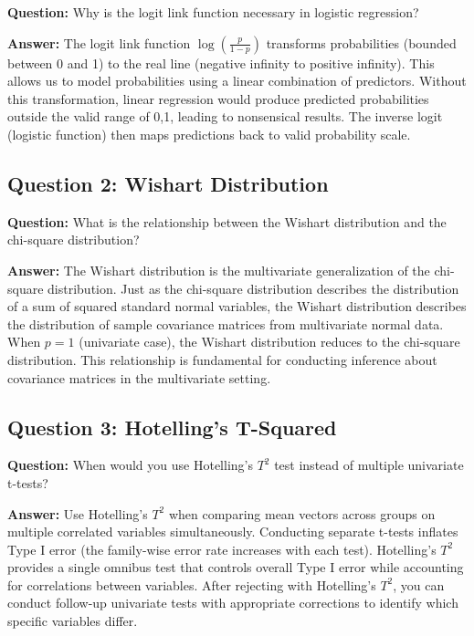 \documentclass[
]{article}
\begin{document}
\textbf{Question:} Why is the logit link function necessary in logistic
regression?

\textbf{Answer:} The logit link function \(\log(\frac{p}{1 - p})\)
transforms probabilities (bounded between 0 and 1) to the real line
(negative infinity to positive infinity). This allows us to model
probabilities using a linear combination of predictors. Without this
transformation, linear regression would produce predicted probabilities
outside the valid range of 0,1, leading to nonsensical results. The
inverse logit (logistic function) then maps predictions back to valid
probability scale.

\textbf{ }

\subsection{Question 2: Wishart Distribution}

\textbf{Question:} What is the relationship between the Wishart
distribution and the chi-square distribution?

\textbf{Answer:} The Wishart distribution is the multivariate
generalization of the chi-square distribution. Just as the chi-square
distribution describes the distribution of a sum of squared standard
normal variables, the Wishart distribution describes the distribution of
sample covariance matrices from multivariate normal data. When \(p = 1\)
(univariate case), the Wishart distribution reduces to the chi-square
distribution. This relationship is fundamental for conducting inference
about covariance matrices in the multivariate setting.

\textbf{ }

\subsection{Question 3: Hotelling's T-Squared}

\textbf{Question:} When would you use Hotelling's \(T^{2}\) test instead
of multiple univariate t-tests?

\textbf{Answer:} Use Hotelling's \(T^{2}\) when comparing mean vectors
across groups on multiple correlated variables simultaneously.
Conducting separate t-tests inflates Type I error (the family-wise error
rate increases with each test). Hotelling's \(T^{2}\) provides a single
omnibus test that controls overall Type I error while accounting for
correlations between variables. After rejecting with Hotelling's
\(T^{2}\), you can conduct follow-up univariate tests with appropriate
corrections to identify which specific variables differ.
\end{document}
